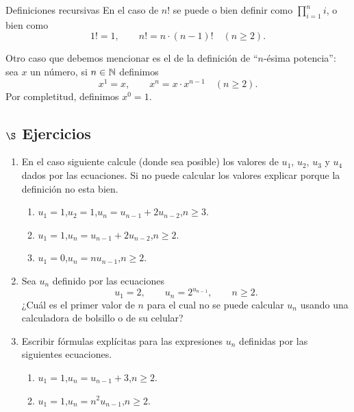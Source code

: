 \begin{section}{Definiciones recursivas}
En  el caso de $n!$ se puede  o bien definir como $\prod_{i=1}^{n} i$, o bien como
$$
1!=1,\qquad n!=n \cdot (n-1)! \quad (n\ge 2).
$$

Otro caso que debemos mencionar es  el de la definición de ``$n$-ésima potencia'': sea $x$ un  número, si $n \in {\mathbb N}$ definimos
$$
x^1=x,\qquad x^n= x \cdot x^{n-1} \quad (n\ge 2).
$$
Por completitud,  definimos $x^0=1$. 

\subsection*{\large $\S$ Ejercicios}
\begin{enumerate}
\item En el caso siguiente calcule (donde sea posible) los valores de $u_1$, $u_2$, $u_3$ y $u_4$ dados por las ecuaciones. Si no puede calcular los valores explicar porque la definición no esta bien.
\begin{enumerate}
\item $u_1 = 1$,\qquad $u_2=1$,\qquad $u_n = u_{n-1} +2 u_{n-2}$,\qquad $n \ge 3$. 
\item $u_1 = 1$,\qquad $u_n = u_{n-1} +2u_{n-2}$,\qquad $n \ge 2$. 
\item $u_1 = 0$,\qquad $u_n = nu_{n-1}$,\qquad $n \ge 2$.
\end{enumerate}
\item Sea $u_n$ definido por las ecuaciones
$$
u_1=2,\qquad u_n= 2^{u_{n-1}}, \qquad n\ge 2.
$$
¿Cuál es el primer valor de $n$ para el cual no se puede calcular $u_n$ usando una calculadora de bolsillo o de su celular?
\item Escribir fórmulas explícitas para las expresiones $u_n$ definidas por las siguientes ecuaciones.
\begin{enumerate}
\item $u_1 = 1$,\qquad $u_n = u_{n-1} +3$,\qquad $n \ge 2$. 
\item $u_1 = 1$,\qquad $u_n = n^2u_{n-1}$,\qquad $n \ge 2$.
\end{enumerate}
\end{enumerate}
\end{section}



